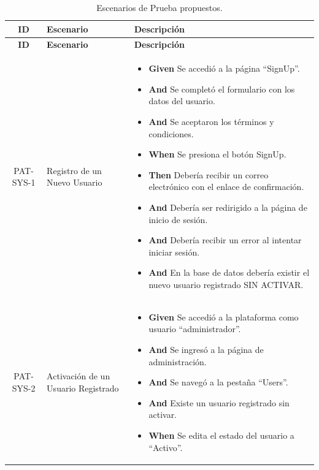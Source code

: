 \begin{longtable}{|c|p{2.5cm}|p{10.5cm}|}
    \caption{Escenarios de Prueba propuestos.}\\
    \hline
    \textbf{ID} & \textbf{Escenario} & \textbf{Descripción} \\
    \hline
    \endfirsthead
    
    \hline
    \textbf{ID} & \textbf{Escenario} & \textbf{Descripción} \\
    \hline
    \endhead
    
    PAT-SYS-1 & Registro de un Nuevo Usuario & 
        \begin{itemize}
            \item \textbf{Given} Se accedió a la página ``SignUp''.
            \item \textbf{And} Se completó el formulario con los datos del usuario.
            \item \textbf{And} Se aceptaron los términos y condiciones.
            \newline
            \item \textbf{When} Se presiona el botón SignUp.
            \newline
            \item \textbf{Then} Debería recibir un correo electrónico con el enlace de confirmación.
            \item \textbf{And} Debería ser redirigido a la página de inicio de sesión.
            \item \textbf{And} Debería recibir un error al intentar iniciar sesión.
            \item \textbf{And} En la base de datos debería existir el nuevo usuario registrado SIN ACTIVAR.
        \end{itemize} \\
    \hline
    PAT-SYS-2 & Activación de un Usuario Registrado & 
    \begin{itemize}
        \item \textbf{Given} Se accedió a la plataforma como usuario ``administrador''.
        \item \textbf{And} Se ingresó a la página de administración.
        \item \textbf{And} Se navegó a la pestaña ``Users''.
        \item \textbf{And} Existe un usuario registrado sin activar.
        \newline
        \item \textbf{When} Se edita el estado del usuario a ``Activo''.

\end{itemize}
\end{longtable}
